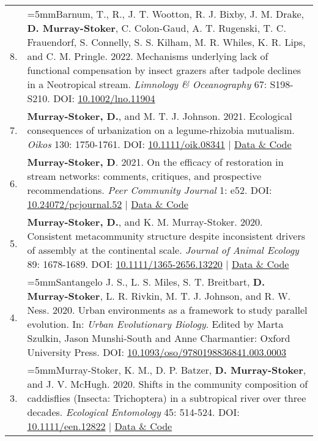 \documentclass[letterpaper,11pt,oneside]{article}
\begin{document}
\begin{longtable}{@{} p{0.5cm} >{\raggedright\arraybackslash}p{16.7cm}}
8. & \hangindent=5mmBarnum, T., R., J. T. Wootton, R. J. Bixby, J. M. Drake, \textbf{D. Murray-Stoker}, C. Colon-Gaud, A. T. Rugenski, T. C. Frauendorf, S. Connelly, S. S. Kilham, M. R. Whiles, K. R. Lips, and C. M. Pringle. 2022. Mechanisms underlying lack of functional compensation by insect grazers after tadpole declines in a Neotropical stream. \textit{Limnology \& Oceanography} 67: S198-S210. DOI: {\href{https://aslopubs.onlinelibrary.wiley.com/doi/full/10.1002/lno.11904}{10.1002/lno.11904}} \\
7. & \hangindent=5mm\textbf{Murray-Stoker, D.}, and M. T. J. Johnson. 2021. Ecological consequences of urbanization on a legume-rhizobia mutualism. \textit{Oikos} 130: 1750-1761. DOI: {\href{https://onlinelibrary.wiley.com/doi/full/10.1111/oik.08341}{10.1111/oik.08341}} | {\href{https://zenodo.org/record/4459724#.YmVqvfPMIbl}{Data \& Code}} \\
6. & \hangindent=5mm\textbf{Murray-Stoker, D}. 2021. On the efficacy of restoration in stream networks: comments, critiques, and prospective recommendations. \textit{Peer Community Journal} 1: e52. DOI: {\href{https://peercommunityjournal.org/articles/10.24072/pcjournal.52/}{10.24072/pcjournal.52}} | {\href{https://doi.org/10.6084/m9.figshare.6448010.v7}{Data \& Code}} \\
5. & \hangindent=5mm\textbf{Murray-Stoker, D.}, and K. M. Murray-Stoker. 2020. Consistent metacommunity structure despite inconsistent drivers of assembly at the continental scale. \textit{Journal of Animal Ecology} 89: 1678-1689. DOI: {\href{http://besjournals.onlinelibrary.wiley.com/doi/abs/10.1111/1365-2656.13220}{10.1111/1365-2656.13220}} | {\href{https://osf.io/62je8/}{Data \& Code}} \\
4. & \hangindent=5mmSantangelo J. S., L. S. Miles, S. T. Breitbart, \textbf{D. Murray-Stoker}, L. R. Rivkin, M. T. J. Johnson, and R. W. Ness. 2020. Urban environments as a framework to study parallel evolution. In: \textit{Urban Evolutionary Biology}. Edited by Marta Szulkin, Jason Munshi-South and Anne Charmantier: Oxford University Press. DOI: {\href{https://oxford.universitypressscholarship.com/view/10.1093/oso/9780198836841.001.0001/oso-9780198836841-chapter-3}{10.1093/oso/9780198836841.003.0003}} \\
3. & \hangindent=5mmMurray-Stoker, K. M., D. P. Batzer, \textbf{D. Murray-Stoker}, and J. V. McHugh. 2020. Shifts in the community composition of caddisflies (Insecta: Trichoptera) in a subtropical river over three decades. \textit{Ecological Entomology} 45: 514-524. DOI: {\href{https://resjournals.onlinelibrary.wiley.com/doi/full/10.1111/een.12822}{10.1111/een.12822}} | {\href{https://doi.org/10.6084/m9.figshare.14237687.v1}{Data \& Code}} \\

\end{longtable}
\end{document}
